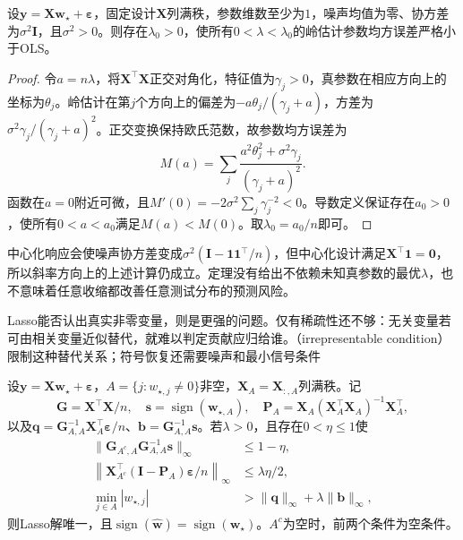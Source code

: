 \begin{theorem}[小幅岭收缩的参数均方误差]
  \label{thm:regression-ridge-mse}
  设$\bm{y}=\bm{X}\bm{w}_{\star}+\bm{\varepsilon}$，固定设计$\bm{X}$列满秩，参数维数至少为$1$，噪声均值为零、协方差为$\sigma^2\bm{I}$，且$\sigma^2>0$。则存在$\lambda_0>0$，使所有$0<\lambda<\lambda_0$的岭估计参数均方误差严格小于OLS。
\end{theorem}

\begin{proof}
令$a=n\lambda$，将$\bm{X}^{\top}\bm{X}$正交对角化，特征值为$\gamma_j>0$，真参数在相应方向上的坐标为$\theta_j$。岭估计在第$j$个方向上的偏差为$-a\theta_j/(\gamma_j+a)$，方差为$\sigma^2\gamma_j/(\gamma_j+a)^2$。正交变换保持欧氏范数，故参数均方误差为
\[
  M(a)=\sum_j\frac{a^2\theta_j^2+\sigma^2\gamma_j}{(\gamma_j+a)^2}.
\]
函数在$a=0$附近可微，且$M'(0)=-2\sigma^2\sum_j\gamma_j^{-2}<0$。导数定义保证存在$a_0>0$，使所有$0<a<a_0$满足$M(a)<M(0)$。取$\lambda_0=a_0/n$即可。
\end{proof}

中心化响应会使噪声协方差变成$\sigma^2(\bm{I}-\bm{1}\bm{1}^{\top}/n)$，但中心化设计满足$\bm{X}^{\top}\bm{1}=\bm{0}$，所以斜率方向上的上述计算仍成立。定理没有给出不依赖未知真参数的最优$\lambda$，也不意味着任意收缩都改善任意测试分布的预测风险。

Lasso能否认出真实非零变量，则是更强的问题。仅有稀疏性还不够：无关变量若可由相关变量近似替代，就难以判定贡献应归给谁。（irrepresentable condition）限制这种替代关系；符号恢复还需要噪声和最小信号条件

\begin{theorem}[Lasso的确定性符号恢复充分条件]
  \label{thm:regression-lasso-recovery}
  设$\bm{y}=\bm{X}\bm{w}_{\star}+\bm{\varepsilon}$，$A=\{j:w_{\star,j}\ne0\}$非空，$\bm{X}_A=\bm{X}_{:,A}$列满秩。记
  \[
    \bm{G}=\bm{X}^{\top}\bm{X}/n,\quad
    \bm{s}=\operatorname{sign}(\bm{w}_{\star,A}),\quad
    \bm{P}_A=\bm{X}_A(\bm{X}_A^{\top}\bm{X}_A)^{-1}\bm{X}_A^{\top},
  \]
  以及$\bm{q}=\bm{G}_{A,A}^{-1}\bm{X}_A^{\top}\bm{\varepsilon}/n$、$\bm{b}=\bm{G}_{A,A}^{-1}\bm{s}$。若$\lambda>0$，且存在$0<\eta\leq1$使
  \begin{align}
    \lVert\bm{G}_{A^c,A}\bm{G}_{A,A}^{-1}\bm{s}\rVert_\infty
      &\leq1-\eta, \label{eq:regression-irrepresentable}\\
    \left\lVert\bm{X}_{A^c}^{\top}(\bm{I}-\bm{P}_A)
                  \bm{\varepsilon}/n\right\rVert_\infty
      &\leq\lambda\eta/2, \label{eq:regression-lasso-noise}\\
    \min_{j\in A}|w_{\star,j}|
      &>\lVert\bm{q}\rVert_\infty+\lambda\lVert\bm{b}\rVert_\infty,
      \label{eq:regression-lasso-beta-min}
  \end{align}
  则Lasso解唯一，且$\operatorname{sign}(\widehat{\bm{w}})=\operatorname{sign}(\bm{w}_{\star})$。$A^c$为空时，前两个条件为空条件。
\end{theorem}

